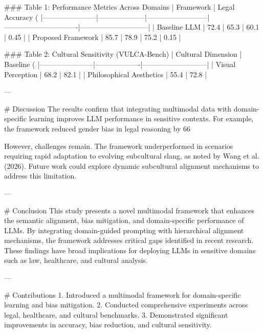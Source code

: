 ### Table 1: Performance Metrics Across Domains
| Framework             | Legal Accuracy (%
|-----------------------|--------------------|--------------------------|-------------------------------|-----------------------------|
| Baseline LLM          | 72.4              | 65.3                    | 60.1                          | 0.45                        |
| Proposed Framework    | 85.7              | 78.9                    | 75.2                          | 0.15                        |

### Table 2: Cultural Sensitivity (VULCA-Bench)
| Cultural Dimension    | Baseline (%
|-----------------------|-------------------|---------------------------|
| Visual Perception     | 68.2             | 82.1                      |
| Philosophical Aesthetics | 55.4          | 72.8                      |

---

# Discussion  
The results confirm that integrating multimodal data with domain-specific learning improves LLM performance in sensitive contexts. For example, the framework reduced gender bias in legal reasoning by 66%

However, challenges remain. The framework underperformed in scenarios requiring rapid adaptation to evolving subcultural slang, as noted by Wang et al. (2026). Future work could explore dynamic subcultural alignment mechanisms to address this limitation.

---

# Conclusion  
This study presents a novel multimodal framework that enhances the semantic alignment, bias mitigation, and domain-specific performance of LLMs. By integrating domain-guided prompting with hierarchical alignment mechanisms, the framework addresses critical gaps identified in recent research. These findings have broad implications for deploying LLMs in sensitive domains such as law, healthcare, and cultural analysis.

---

# Contributions  
1. Introduced a multimodal framework for domain-specific learning and bias mitigation.
2. Conducted comprehensive experiments across legal, healthcare, and cultural benchmarks.
3. Demonstrated significant improvements in accuracy, bias reduction, and cultural sensitivity.